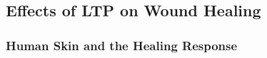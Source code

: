 \documentclass[11pt, oneside]{article}   	%
\begin{document}



\subsection{Effects of LTP on Wound Healing}
%




\subsubsection{Human Skin and the Healing Response}
\end{document}
